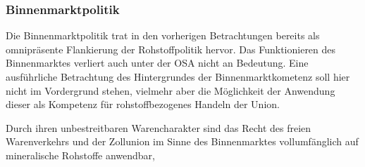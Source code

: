 \documentclass[12pt,a4paper,oneside]{book} %
\begin{document}
\subsubsection{Binnenmarktpolitik}
	
Die Binnenmarktpolitik trat in den vorherigen Betrachtungen bereits als omnipräsente Flankierung der Rohstoffpolitik hervor. Das Funktionieren des Binnenmarktes verliert auch unter der OSA nicht an Bedeutung. Eine ausführliche Betrachtung des Hintergrundes der Binnenmarktkometenz soll hier nicht im Vordergrund stehen, vielmehr aber die Möglichkeit der Anwendung dieser als Kompetenz für rohstoffbezogenes Handeln der Union.


Durch ihren unbestreitbaren Warencharakter sind das Recht des freien Warenverkehrs und der Zollunion im Sinne des Binnenmarktes vollumfänglich auf mineralische Rohstoffe anwendbar,\autocite{Schorkopf, Rohstoffverwaltung Rn. 6f..}
\end{document}
